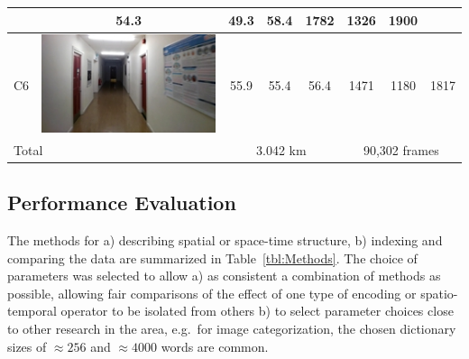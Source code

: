 \begin{table}[ht]
\begin{center}
\begin{tabular}{l c c c c c c c}
\begin{minipage}{.1\textwidth}
			   \end{minipage}
			        & 54.3  & 49.3 & 58.4 & 1782          & 1326 & 1900 \\ \hline
    C6       & \begin{minipage}{.1\textwidth}
      			\includegraphics[width=\linewidth]{./gfx/Chapter04/table/6.jpg}
			   \end{minipage}
			        & 55.9  & 55.4 & 56.4 & 1471          & 1180 & 1817 \\ \hline \hline
	\multicolumn{2}{l}{Total}      & \multicolumn{3}{c}{3.042 km} & \multicolumn{3}{c}{90,302 frames} \\ \hline
    \end{tabular}

\end{center}
\end{table}

\subsection{Performance Evaluation}

The methods for a) describing spatial or space-time structure, b) indexing and comparing the data are summarized in Table~\ref{tbl:Methods}. The choice of parameters was selected to allow a) as consistent a combination of methods as possible, allowing fair comparisons of the effect of one type of encoding or spatio-temporal operator to be isolated from others b) to select parameter choices close to other research in the area, e.g.\ for image categorization, the chosen dictionary sizes of $\approx 256$ and $\approx 4000$ words are common. 

